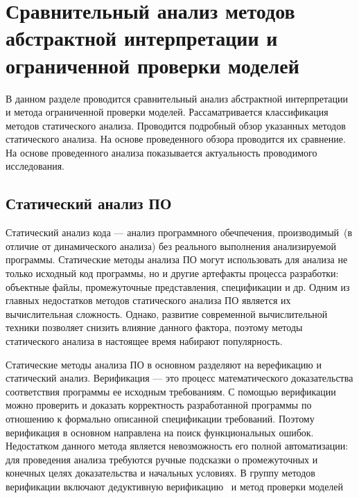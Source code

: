 \chapter{Сравнительный анализ методов абстрактной интерпретации и ограниченной 
проверки моделей}

В данном разделе проводится сравнительный анализ абстрактной интерпретации и 
метода ограниченной проверки моделей. Рассаматривается классификация методов 
статического анализа. Проводится подробный обзор указанных методов статического 
анализа. На основе проведенного обзора проводится их сравнение. На основе 
проведенного анализа показывается актуальность проводимого исследования.

\section{Статический анализ ПО}

Статический анализ кода --- анализ программного обечпечения, производимый~(в 
отличие от динамического анализа) без реального выполнения анализируемой 
программы. Статические методы анализа ПО могут использовать для анализа не 
только исходный код программы, но и другие артефакты процесса разработки:
объектные файлы, промежуточные представления, спецификации и др. Одним из
главных недостатков методов статического анализа ПО является их вычислительная
сложность. Однако, развитие современной вычислительной техники позволяет
снизить влияние данного фактора, поэтому методы статического анализа в
настоящее время набирают популярность. 

Статические методы анализа ПО в основном разделяют на верефикацию и статический
анализ. Верификация --- это процесс математического доказательства соответствия 
программы ее исходным требованиям. С помощью верификации можно проверить и
доказать корректность разработанной программы по отношению к формально
описанной спецификации требований. Поэтому верификация в основном направлена
на поиск функциональных ошибок. Недостатком данного метода является
невозможность его полной автоматизации: для проведения анализа требуются ручные
подсказки о промежуточных и конечных целях доказательства и начальных условиях.
В группу методов верификации включают дедуктивную верификацию~\cite{
deductiveVerification} и метод проверки моделей~\cite{modelChecking}

